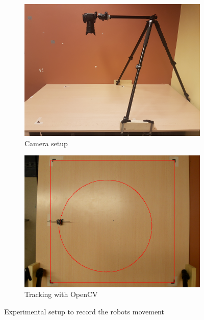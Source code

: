 \begin{figure}
	\centering
	\begin{subfigure}[b]{0.45\textwidth}
		\includegraphics[width=\textwidth]{pics/movement_setup.jpg}
		\caption{Camera setup}
		\label{fig:movement_setup}
	\end{subfigure}
	\quad
	\begin{subfigure}[b]{0.45\textwidth}
		\includegraphics[width=\textwidth]{pics/movement_example.png}
		\caption{Tracking with OpenCV}
		\label{fig:movement_example}
	\end{subfigure}
	\caption{Experimental setup to record the robots movement}
\end{figure}


